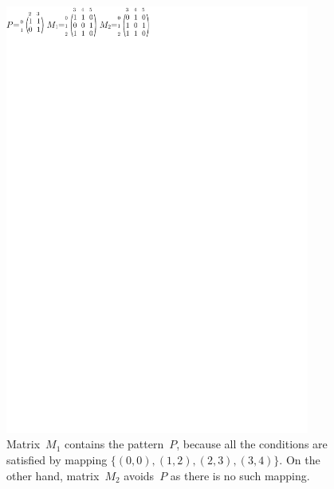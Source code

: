 \begin{figure}[h!]
\centering
\includegraphics[width=100mm]{../img/avoiding.pdf}
\caption{Matrix~$M_1$ contains the pattern~$P$, because all the conditions are satisfied by mapping $\{(0,0),(1,2),(2,3),(3,4)\}$. On the other hand, matrix~$M_2$ avoids~$P$ as there is no such mapping.}
\label{avoiding}
\end{figure}

